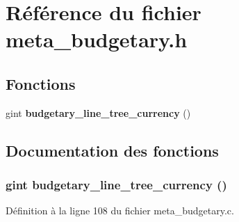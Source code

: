 \section{Référence du fichier meta\_\-budgetary.h}
\label{meta__budgetary_8h}
\subsection*{Fonctions}
\begin{DoxyCompactItemize}
\item 
gint {\bf budgetary\_\-line\_\-tree\_\-currency} ()
\end{DoxyCompactItemize}


\subsection{Documentation des fonctions}
\subsubsection[{budgetary\_\-line\_\-tree\_\-currency}]{\setlength{\rightskip}{0pt plus 5cm}gint budgetary\_\-line\_\-tree\_\-currency ()}\label{meta__budgetary_8h_a646da781949900e101ad620ddc693a38}


Définition à la ligne 108 du fichier meta\_\-budgetary.c.

